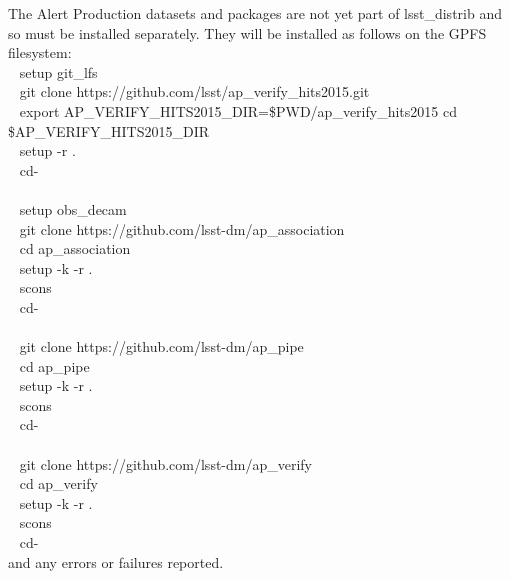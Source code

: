 The Alert Production datasets and packages are not yet part of
lsst\_distrib and so must be installed separately. They will be
installed as follows on the GPFS
filesystem:\\[2\baselineskip]\hspace*{0.333em} ~ setup git\_lfs\\
\hspace*{0.333em} ~ git clone
https://github.com/lsst/ap\_verify\_hits2015.git\\[2\baselineskip]\hspace*{0.333em}
~ export AP\_VERIFY\_HITS2015\_DIR=\$PWD/ap\_verify\_hits2015 cd
\$AP\_VERIFY\_HITS2015\_DIR\\
\hspace*{0.333em} ~ setup -r .\\
\hspace*{0.333em} ~ cd-\\
\hspace*{0.333em} ~\\
\hspace*{0.333em} ~ setup obs\_decam\\
\hspace*{0.333em} ~ git clone
https://github.com/lsst-dm/ap\_association\\
\hspace*{0.333em} ~ cd ap\_association\\
\hspace*{0.333em} ~ setup -k -r .\\
\hspace*{0.333em} ~ scons\\
\hspace*{0.333em} ~ cd-\\
\hspace*{0.333em} ~\\
\hspace*{0.333em} ~ git clone https://github.com/lsst-dm/ap\_pipe\\
\hspace*{0.333em} ~ cd ap\_pipe\\
\hspace*{0.333em} ~ setup -k -r .\\
\hspace*{0.333em} ~ scons\\
\hspace*{0.333em} ~ cd-\\
\hspace*{0.333em} ~\\
\hspace*{0.333em} ~ git clone https://github.com/lsst-dm/ap\_verify\\
\hspace*{0.333em} ~ cd ap\_verify\\
\hspace*{0.333em} ~ setup -k -r .\\
\hspace*{0.333em} ~ scons\\
\hspace*{0.333em} ~ cd-\\[2\baselineskip]and any errors or failures
reported.\\[2\baselineskip]

